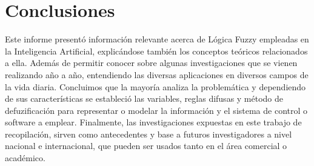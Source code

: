 \documentclass[10pt,conference]{IEEEtran}
\begin{document}
\section{\textbf{Conclusiones}}
Este informe presentó información relevante acerca de Lógica Fuzzy empleadas en la Inteligencia Artificial, explicándose también los conceptos teóricos relacionados a ella. Además de permitir conocer sobre algunas investigaciones que se vienen realizando año a año, entendiendo las diversas aplicaciones en diversos campos de la vida diaria. Concluimos que la mayoría analiza la problemática y dependiendo de sus características se estableció las variables, reglas difusas y método de defuzificación para representar o modelar la información y el sistema de control o software a emplear. Finalmente, las investigaciones expuestas en este trabajo de recopilación, sirven como antecedentes y base a futuros investigadores a nivel nacional e internacional, que pueden ser usados tanto en el área comercial o académico.
\medskip

\end{document}
